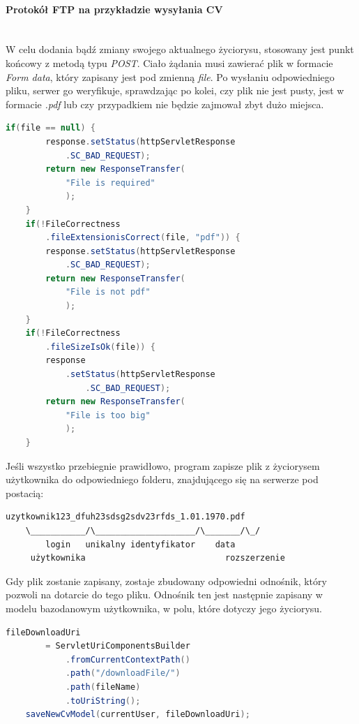 \documentclass[twoside]{projektInzynierskiMS}
\numberwithin{figure}{section}
\begin{document}
\paragraph{Protokół FTP na przykładzie wysyłania CV}
\mbox{} \\ \indent
W celu dodania bądź zmiany swojego aktualnego życiorysu, stosowany jest punkt końcowy z metodą typu \textit{POST}. Ciało żądania musi zawierać plik w formacie \textit{Form data}, który zapisany jest pod zmienną \textit{file}. Po wysłaniu odpowiedniego pliku, serwer go weryfikuje, sprawdzając po kolei, czy plik nie jest pusty, jest w formacie \textit{.pdf} lub czy przypadkiem nie będzie zajmował zbyt dużo miejsca.
\begin{lstlisting}[language=Java,caption=Sprawdzenie poprawności wysyłanego pliku. Źródło: Opracowanie własne.,captionpos=b]
    if(file == null) {
        response.setStatus(httpServletResponse
            .SC_BAD_REQUEST);
        return new ResponseTransfer(
            "File is required"
            );
    }
    if(!FileCorrectness
        .fileExtensionisCorrect(file, "pdf")) {
        response.setStatus(httpServletResponse
            .SC_BAD_REQUEST);
        return new ResponseTransfer(
            "File is not pdf"
            );
    }
    if(!FileCorrectness
        .fileSizeIsOk(file)) {
        response
            .setStatus(httpServletResponse
                .SC_BAD_REQUEST);
        return new ResponseTransfer(
            "File is too big"
            );
    }
\end{lstlisting}
Jeśli wszystko przebiegnie prawidłowo, program zapisze plik z życiorysem użytkownika do odpowiedniego folderu, znajdującego się na serwerze pod postacią:

    \begin{lstlisting}[caption=Struktura nazwy pliku życiorysu. Źródło: Opracowanie własne.,captionpos=b]
    uzytkownik123_dfuh23sdsg2sdv23rfds_1.01.1970.pdf
    \___________/\____________________/\_______/\_/
        login   unikalny identyfikator    data
     użytkownika                            rozszerzenie
    \end{lstlisting}
Gdy plik zostanie zapisany, zostaje zbudowany odpowiedni odnośnik, który pozwoli na dotarcie do tego pliku. Odnośnik ten jest następnie zapisany w modelu bazodanowym użytkownika, w polu, które dotyczy jego życiorysu.

\begin{lstlisting}[language=Java,caption=Utworzenie odnośnika do pliku. Źródło: Opracowanie własne.,captionpos=b]
    fileDownloadUri 
        = ServletUriComponentsBuilder
            .fromCurrentContextPath()
            .path("/downloadFile/")
            .path(fileName)
            .toUriString();
    saveNewCvModel(currentUser, fileDownloadUri);
\end{lstlisting}
\end{document}
